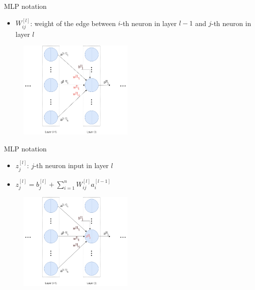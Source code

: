 \documentclass[compress,oilve,t]{beamer}
\begin{document}
\begin{frame}{MLP notation}
	\begin{itemize}
		\item $W^{[l]}_{ij}$: weight of the edge between $i$-th neuron in layer $l-1$ and $j$-th neuron in layer $l$ 
	\end{itemize}
	\begin{figure}[H]
		\centering
		\includegraphics[width=0.5\textwidth]{Figs/notation2.png}
	\end{figure}
\end{frame}

\begin{frame}{MLP notation}
	\begin{itemize}
		\item $z^{[l]}_j$: $j$-th neuron input in layer $l$
		\item $z^{[l]}_j = b_j^{[l]} + \sum_{i=1}^n W^{[l]}_{ij}a^{[l-1]}_i$
	\end{itemize}
	\begin{figure}[H]
		\centering
		\includegraphics[width=0.5\textwidth]{Figs/notation3.png}
	\end{figure}
\end{frame}
\end{document}
